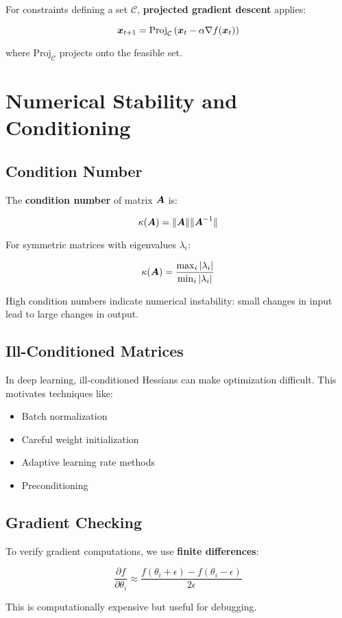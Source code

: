 For constraints defining a set $\mathcal{C}$, \textbf{projected gradient descent} applies:

\begin{equation}
\boldsymbol{x}_{t+1} = \text{Proj}_{\mathcal{C}}\left(\boldsymbol{x}_t - \alpha \nabla f(\boldsymbol{x}_t)\right)
\end{equation}

where $\text{Proj}_{\mathcal{C}}$ projects onto the feasible set.

\section{Numerical Stability and Conditioning}
\label{sec:numerical-stability}

\subsection{Condition Number}

The \textbf{condition number} of matrix $\boldsymbol{A}$ is:

\begin{equation}
\kappa(\boldsymbol{A}) = \|\boldsymbol{A}\| \|\boldsymbol{A}^{-1}\|
\end{equation}

For symmetric matrices with eigenvalues $\lambda_i$:

\begin{equation}
\kappa(\boldsymbol{A}) = \frac{\max_i |\lambda_i|}{\min_i |\lambda_i|}
\end{equation}

High condition numbers indicate numerical instability: small changes in input lead to large changes in output.

\subsection{Ill-Conditioned Matrices}

In deep learning, ill-conditioned Hessians can make optimization difficult. This motivates techniques like:
\begin{itemize}
    \item Batch normalization
    \item Careful weight initialization
    \item Adaptive learning rate methods
    \item Preconditioning
\end{itemize}

\subsection{Gradient Checking}

To verify gradient computations, we use \textbf{finite differences}:

\begin{equation}
\frac{\partial f}{\partial \theta_i} \approx \frac{f(\theta_i + \epsilon) - f(\theta_i - \epsilon)}{2\epsilon}
\end{equation}

This is computationally expensive but useful for debugging.
